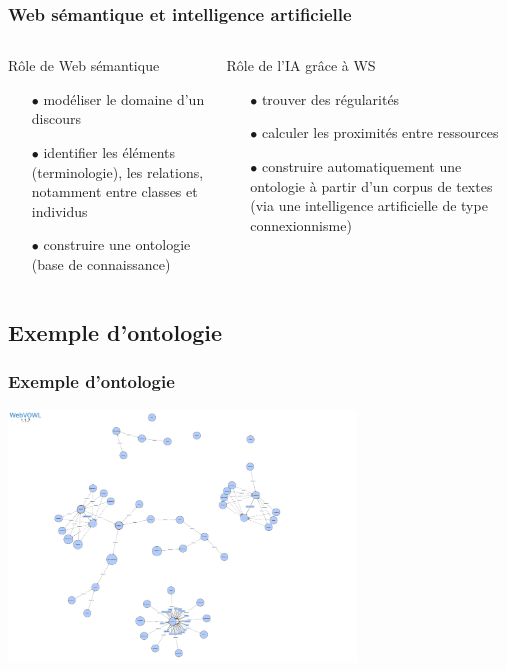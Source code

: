 \documentclass[xcolor=dvipsnames]{beamer}
\begin{document}
\begin{frame}[fragile]
\frametitle{Web sémantique et intelligence artificielle}
\begin{columns}
	\begin{block}{Rôle de Web sémantique}
		\begin{itemize}
			\item[$\bullet$]modéliser le domaine d'un discours
			\item[$\bullet$]identifier les éléments (terminologie), les relations, notamment entre classes et individus
			\item[$\bullet$] construire une ontologie (base de connaissance)
		\end{itemize}
	\end{block}
	\begin{block}{Rôle de l'IA grâce à WS}
		\begin{itemize}
			\item[$\bullet$]trouver des régularités
			\item[$\bullet$]calculer les proximités entre ressources
			\item[$\bullet$]construire automatiquement une ontologie à partir d'un corpus de textes (via une intelligence artificielle de type connexionnisme)
		\end{itemize}
	\end{block}
\end{columns}
\end{frame}

\subsection{Exemple d'ontologie}
\begin{frame}[fragile]
\frametitle{Exemple d'ontologie}
	\includegraphics[height = 6.7cm]{images/Ontologie_1.png}
\end{frame}
\end{document}

